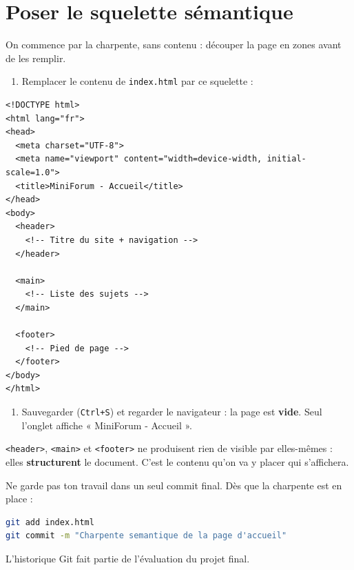 \documentclass[a4paper,11pt]{article}
\begin{document}
\section{Poser le squelette sémantique}

On commence par la charpente, sans contenu : découper la page en zones avant de les remplir.

\begin{enumerate}
  \item Remplacer le contenu de \texttt{index.html} par ce squelette :
\end{enumerate}

\begin{lstlisting}[language=HTML5, caption={\texttt{index.html} --- la charpente}]
<!DOCTYPE html>
<html lang="fr">
<head>
  <meta charset="UTF-8">
  <meta name="viewport" content="width=device-width, initial-scale=1.0">
  <title>MiniForum - Accueil</title>
</head>
<body>
  <header>
    <!-- Titre du site + navigation -->
  </header>

  <main>
    <!-- Liste des sujets -->
  </main>

  <footer>
    <!-- Pied de page -->
  </footer>
</body>
</html>
\end{lstlisting}

\begin{enumerate}[resume]
  \item Sauvegarder (\texttt{Ctrl+S}) et regarder le navigateur : la page est \textbf{vide}. Seul l'onglet affiche « MiniForum - Accueil ».
\end{enumerate}

\begin{tcolorbox}[attention, title={Pourquoi une page vide ?}]
\texttt{<header>}, \texttt{<main>} et \texttt{<footer>} ne produisent rien de visible par elles-mêmes : elles \textbf{structurent} le document. C'est le contenu qu'on va y placer qui s'affichera.
\end{tcolorbox}

\begin{tcolorbox}[astuce, title={Un premier commit tout de suite}]
Ne garde pas ton travail dans un seul commit final. Dès que la charpente est en place :
\vspace{3pt}
\begin{lstlisting}[language=bash, numbers=none]
git add index.html
git commit -m "Charpente semantique de la page d'accueil"
\end{lstlisting}
\vspace{-3pt}
L'historique Git fait partie de l'évaluation du projet final.
\end{tcolorbox}
\end{document}
